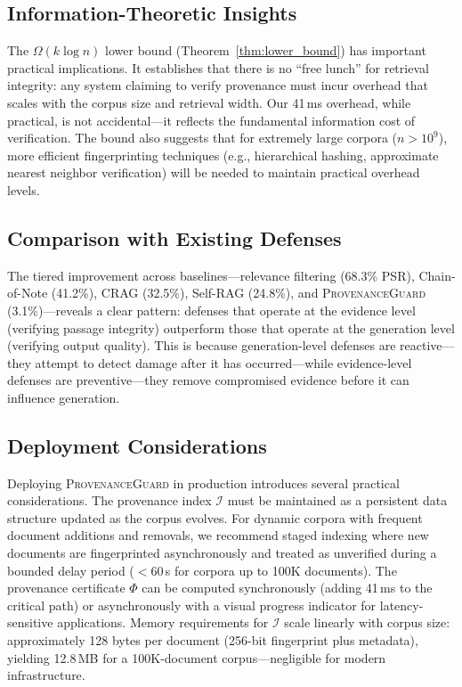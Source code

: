 \documentclass[journal,10pt]{IEEEtran}
\newcommand{\calI}{\mathcal{I}}
\begin{document}
\subsection{Information-Theoretic Insights}
The $\Omega(k \log n)$ lower bound (Theorem~\ref{thm:lower_bound}) has important practical implications. It establishes that there is no ``free lunch'' for retrieval integrity: any system claiming to verify provenance must incur overhead that scales with the corpus size and retrieval width. Our 41\,ms overhead, while practical, is not accidental---it reflects the fundamental information cost of verification. The bound also suggests that for extremely large corpora ($n > 10^9$), more efficient fingerprinting techniques (e.g., hierarchical hashing, approximate nearest neighbor verification) will be needed to maintain practical overhead levels.

\subsection{Comparison with Existing Defenses}
The tiered improvement across baselines---relevance filtering (68.3\% PSR), Chain-of-Note (41.2\%), CRAG (32.5\%), Self-RAG (24.8\%), and \textsc{ProvenanceGuard} (3.1\%)---reveals a clear pattern: defenses that operate at the evidence level (verifying passage integrity) outperform those that operate at the generation level (verifying output quality). This is because generation-level defenses are reactive---they attempt to detect damage after it has occurred---while evidence-level defenses are preventive---they remove compromised evidence before it can influence generation.

\subsection{Deployment Considerations}
Deploying \textsc{ProvenanceGuard} in production introduces several practical considerations. The provenance index $\calI$ must be maintained as a persistent data structure updated as the corpus evolves. For dynamic corpora with frequent document additions and removals, we recommend staged indexing where new documents are fingerprinted asynchronously and treated as unverified during a bounded delay period ($< 60$\,s for corpora up to 100K documents). The provenance certificate $\Phi$ can be computed synchronously (adding 41\,ms to the critical path) or asynchronously with a visual progress indicator for latency-sensitive applications. Memory requirements for $\calI$ scale linearly with corpus size: approximately 128 bytes per document (256-bit fingerprint plus metadata), yielding 12.8\,MB for a 100K-document corpus---negligible for modern infrastructure.
\end{document}
